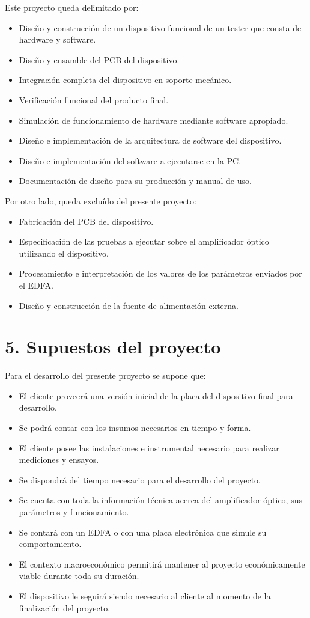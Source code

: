 \documentclass[
11pt, %
]{charter}
\begin{document}
Este proyecto queda delimitado por:
\begin{itemize}
	\item Diseño y construcción de un dispositivo funcional de un tester que consta de hardware y software.
	\item Diseño y ensamble del PCB del dispositivo.
	\item Integración completa del dispositivo en soporte mecánico.
	\item Verificación funcional del producto final.
	\item Simulación de funcionamiento de hardware mediante software apropiado.
	\item Diseño e implementación de la arquitectura de software del dispositivo.
	\item Diseño e implementación del software a ejecutarse en la PC.
	\item Documentación de diseño para su producción y manual de uso.
\end{itemize}

Por otro lado, queda excluído del presente proyecto:
\begin{itemize}
	\item Fabricación del PCB del dispositivo.
	\item Especificación de las pruebas a ejecutar sobre el amplificador óptico utilizando el dispositivo.
	\item Procesamiento e interpretación de los valores de los parámetros enviados por el EDFA.
	\item Diseño y construcción de la fuente de alimentación externa.
\end{itemize}


\section{5. Supuestos del proyecto}
\label{sec:supuestos}

Para el desarrollo del presente proyecto se supone que:
\begin{itemize}
	\item El cliente proveerá una versión inicial de la placa del dispositivo final para desarrollo.
	\item Se podrá contar con los insumos necesarios en tiempo y forma.
	\item El cliente posee las instalaciones e instrumental necesario para realizar mediciones y ensayos.
	\item Se dispondrá del tiempo necesario para el desarrollo del proyecto.
	\item Se cuenta con toda la información técnica acerca del amplificador óptico, sus parámetros y funcionamiento.
	\item Se contará con un EDFA o con una placa electrónica que simule su comportamiento.
	\item El contexto macroeconómico permitirá mantener al proyecto económicamente viable durante toda su duración.
	\item El dispositivo le seguirá siendo necesario al cliente al momento de la finalización del proyecto.
\end{itemize}
\end{document}
